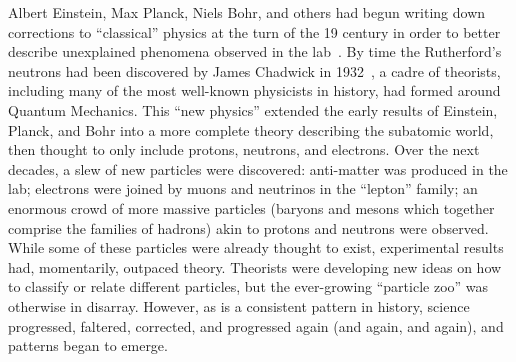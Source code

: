 \begin{dissertationintroduction}
Albert Einstein, Max Planck, Niels Bohr, and others had begun writing down corrections to ``classical'' physics at the turn of the 19 century in order to better describe unexplained phenomena observed in the lab~\cite{EinsteinPhotoelectric, Planck, Bohr}. 
By time the Rutherford's neutrons had been discovered by James Chadwick in 1932~\cite{Chadwick1932}, a cadre of theorists, including many of the most well-known physicists in history\footnotemark{}, had formed around Quantum Mechanics.
This ``new physics'' extended the early results of Einstein, Planck, and Bohr into a more complete theory describing the subatomic world, then thought to only include protons, neutrons, and electrons. 
Over the next decades, a slew of new particles were discovered: 
anti-matter was produced in the lab; %
electrons were joined by muons and neutrinos in the ``lepton'' family; %
an enormous crowd of more massive particles (baryons and mesons which together comprise the families of hadrons) akin to protons and neutrons were observed. %
While some of these particles were already thought to exist, experimental results had, momentarily, outpaced theory. 
Theorists were developing new ideas on how to classify or relate different particles, but the ever-growing ``particle zoo'' was otherwise in disarray. 
However, as is a consistent pattern in history, science progressed, faltered, corrected, and progressed again (and again, and again), and patterns began to emerge. 


\end{dissertationintroduction}
